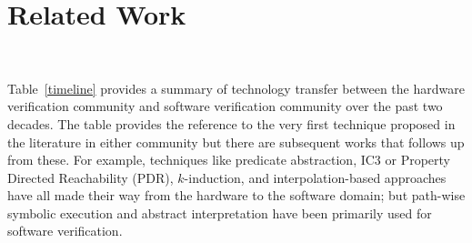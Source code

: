 \section{Related Work}~\label{related_work}
%



Table~\ref{timeline} provides a summary of technology transfer between the 
hardware verification community and software verification community over the past 
two decades.  The table provides the reference to the very first technique proposed 
in the literature in either community but there are subsequent works that
follows up from these.  For example, techniques like predicate abstraction, 
IC3 or Property Directed Reachability (PDR), $k$-induction, and 
interpolation-based approaches have all made their way from the hardware 
to the software domain; but path-wise symbolic execution and abstract 
interpretation have been primarily used for software verification.
%
